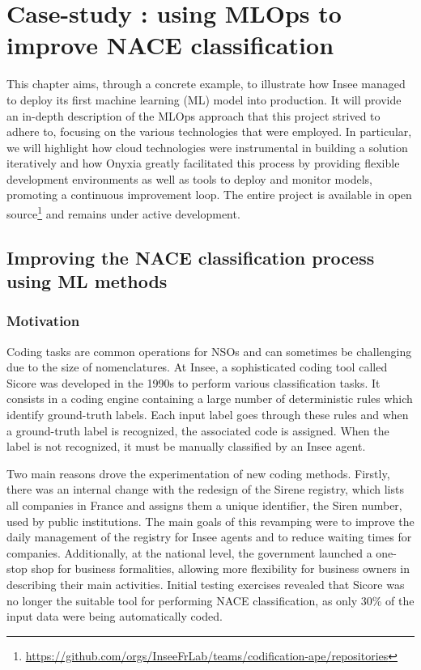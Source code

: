 \section{Case-study : using MLOps to improve NACE classification}
\label{sec:mlops}

This chapter aims, through a concrete example, to illustrate how Insee managed to deploy its first machine learning (ML) model into production. It will provide an in-depth description of the MLOps approach that this project strived to adhere to, focusing on the various technologies that were employed. In particular, we will highlight how cloud technologies were instrumental in building a solution iteratively and how Onyxia greatly facilitated this process by providing flexible development environments as well as tools to deploy and monitor models, promoting a continuous improvement loop. The entire project is available in open source\footnote{\url{https://github.com/orgs/InseeFrLab/teams/codification-ape/repositories}} and remains under active development.






\subsection{Improving the NACE classification process using ML methods}

\subsubsection{Motivation}

Coding tasks are common operations for NSOs and can sometimes be challenging due to the size of nomenclatures. At Insee, a sophisticated coding tool called Sicore was developed in the 1990s to perform various classification tasks. It consists in a coding engine containing a large number of deterministic rules which identify ground-truth labels. Each input label goes through these rules and when a ground-truth label is recognized, the associated code is assigned. When the label is not recognized, it must be manually classified by an Insee agent. 

Two main reasons drove the experimentation of new coding methods. Firstly, there was an internal change with the redesign of the Sirene registry, which lists all companies in France and assigns them a unique identifier, the Siren number, used by public institutions. The main goals of this revamping were to improve the daily management of the registry for Insee agents and to reduce waiting times for companies. Additionally, at the national level, the government launched a one-stop shop for business formalities, allowing more flexibility for business owners in describing their main activities. Initial testing exercises revealed that Sicore was no longer the suitable tool for performing NACE classification, as only 30\% of the input data were being automatically coded.

